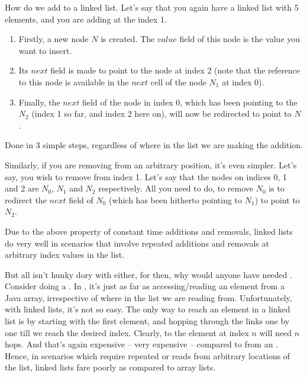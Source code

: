\documentclass[12pt,a4paper]{article}
\begin{document}
How do we add to a linked list. Let's say that you again have a linked list with 5 elements, and you are adding at the index 1. 
\begin{enumerate}
	\item Firstly, a new node $N$ is created. The $value$ field of this node is the value you want to insert.
	\item Its $next$ field is made to point to the node at index 2 (note that the reference to this node is available in the $next$ cell of the node $N_1$ at index 0).
	\item Finally, the $next$ field of the node in index 0, which has been pointing to the $N_2$ (index 1 so far, and index 2 here on), will now be redirected to point to $N$.
\end{enumerate}
 
Done in 3 simple steps, regardless of where in the list we are making the addition.

Similarly, if you are removing from an arbitrary position, it's even simpler. Let's say, you wish to remove from index 1. Let's say that the nodes on indices 0, 1 and 2 are $N_0$, $N_1$ and $N_2$ respectively. All you need to do, to remove $N_0$ is to redirect the $next$ field of $N_0$ (which has been hitherto pointing to $N_1$) to point to $N_2$.

Due to the above property of constant time additions and removals, linked lists do very well in scenarios that involve repeated additions and removals at arbitrary index values in the list.

But all isn't hunky dory with \lstinline@LikedList@s either, for then, why would anyone have needed \lstinline@ArrayList@s. Consider doing a \lstinline@get@. In \lstinline@ArrayList@, it's just as far as accessing/reading an element from a Java array, irrespective of where in the list we are reading from. Unfortunately, with linked lists, it's not so easy. The only way to reach an element in a linked list is by starting with the first element, and hopping through the links one by one till we reach the desired index. Clearly, to \lstinline@get@ the element at index $n$ will need $n$ hops. And that's again expensive -- very expensive -- compared to \lstinline@get@ting from an \lstinline@ArrayList@. Hence, in scenarios which require repeated \lstinline@get@s or reads from arbitrary locations of the list, linked lists fare poorly as compared to array lists.
\end{document}
